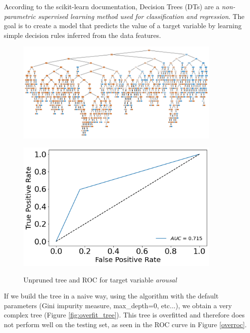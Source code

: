 \documentclass[a4paper,11pt,dvipsnames]{article}
\begin{document}
According to the scikit-learn documentation, Decision Trees (DTs) are a \textit{non-parametric supervised learning method used for classification and regression}\cite{JMLR:v12:pedregosa11a}. The goal is to create a model that predicts the value of a target variable by learning simple decision rules inferred from the data features.

\begin{figure}[h]
\begin{minipage}{0.7\linewidth}
        \centering
    \includegraphics[width=0.9\textwidth]{overfit_tree_arousal.png}
    \label{fig:overfit_tree}
\end{minipage}
\hfill
    \begin{minipage}{0.3\linewidth}
            \centering
            \includegraphics[width=0.9\textwidth]{arousal_overfit_ROC.png}
            \label{overroc}
    \end{minipage}
    \caption{Unpruned tree and ROC for target variable \textit{arousal}}\label{overfit}
\end{figure}

If we build the tree in a naive way, using the algorithm with the default parameters (Gini impurity measure, max\_depth=0, etc...), we obtain a very complex tree (Figure \ref{fig:overfit_tree}). This tree is overfitted and therefore does not perform well on the testing set, as seen in the ROC curve in Figure \ref{overroc}.
\end{document}
